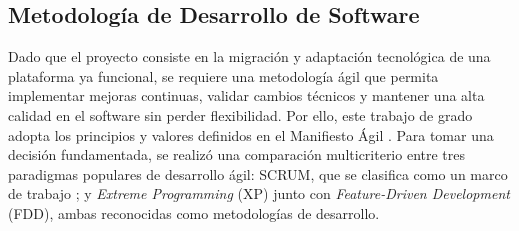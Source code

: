 \subsection{Metodología de Desarrollo de Software}

Dado que el proyecto consiste en la migración y adaptación tecnológica de una plataforma ya funcional, se requiere una metodología ágil que permita implementar mejoras continuas, validar cambios técnicos y mantener una alta calidad en el software sin perder flexibilidad. Por ello, este trabajo de grado adopta los principios y valores definidos en el Manifiesto Ágil \cite{AgileManifesto2001}. Para tomar una decisión fundamentada, se realizó una comparación multicriterio entre tres paradigmas populares de desarrollo ágil: SCRUM, que se clasifica como un marco de trabajo \cite{ScrumGuide2020}; y \textit{Extreme Programming} (XP) junto con \textit{Feature-Driven Development} (FDD), ambas reconocidas como metodologías de desarrollo.

\newcommand{\comparativaMetodologiasHeader}{
  \grayTableHeaderCell{3cm}{Criterio} &
  \grayTableHeaderCell{3cm}{SCRUM} &
  \grayTableHeaderCell{3cm}{XP} &
  \grayTableHeaderCell{3cm}{FDD} \\
}

